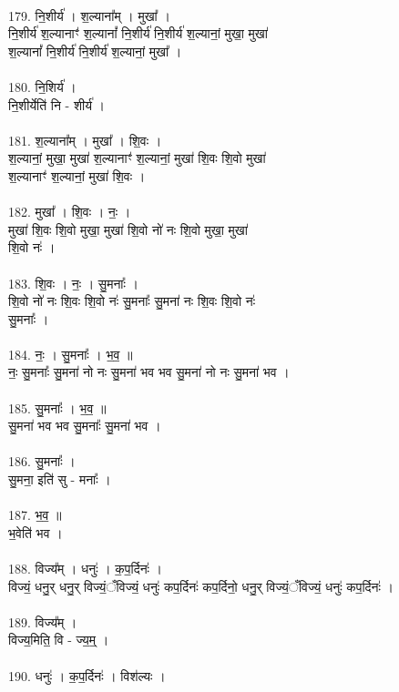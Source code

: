 \\
179. नि॒शीर्य॑ । श॒ल्याना᳚म् । मुखा᳚ ।\\
नि॒शीर्य॑ श॒ल्यानाꣳ॑ श॒ल्यानां᳚ नि॒शीर्य॑ नि॒शीर्य॑ श॒ल्यानां॒ मुखा॒ मुखा॑\\
श॒ल्यानां᳚ नि॒शीर्य॑ नि॒शीर्य॑ श॒ल्यानां॒ मुखा᳚ ।\\
\\
180. नि॒शिर्य॑ ।\\
नि॒शीर्येति॑ नि - शीर्य॑ ।\\
\\
181. श॒ल्याना᳚म् । मुखा᳚ । शि॒वः ।\\
श॒ल्यानां॒ मुखा॒ मुखा॑ श॒ल्यानाꣳ॑ श॒ल्यानां॒ मुखा॑ शि॒वः शि॒वो मुखा॑\\
श॒ल्यानाꣳ॑ श॒ल्यानां॒ मुखा॑ शि॒वः ।\\
\\
182. मुखा᳚ । शि॒वः । नः॒ ।\\
मुखा॑ शि॒वः शि॒वो मुखा॒ मुखा॑ शि॒वो नो॑ नः शि॒वो मुखा॒ मुखा॑\\
शि॒वो नः॑ ।\\
\\
183. शि॒वः । नः॒ । सु॒मनाः᳚ ।\\
शि॒वो नो॑ नः शि॒वः शि॒वो नः॑ सु॒मनाः᳚ सु॒मना॑ नः शि॒वः शि॒वो नः॑\\
सु॒मनाः᳚ ।\\
\\
184. नः॒ । सु॒मनाः᳚ । भ॒व॒ ॥\\
नः॒ सु॒मनाः᳚ सु॒मना॑ नो नः सु॒मना॑ भव भव सु॒मना॑ नो नः सु॒मना॑ भव ।\\
\\
185. सु॒मनाः᳚ । भ॒व॒ ॥\\
सु॒मना॑ भव भव सु॒मनाः᳚ सु॒मना॑ भव ।\\
\\
186. सु॒मनाः᳚ ।\\
सु॒मना॒ इति॑ सु - मनाः᳚ ।\\
\\
187. भ॒व॒ ॥\\
भ॒वेति॑ भव ।\\
\\
188. विज्य᳚म् । धनुः॑ । क॒प॒र्दिनः॑ ।\\
विज्यं॒ धनु॒र् धनु॒र् विज्यं॒ँविज्यं॒ धनुः॑ कप॒र्दिनः॑ कप॒र्दिनो॒ धनु॒र् विज्यं॒ँविज्यं॒ धनुः॑ कप॒र्दिनः॑ ।\\
\\
189. विज्य᳚म् ।\\
विज्य॒मिति॒ वि - ज्य॒म्॒ ।\\
\\
190. धनुः॑ । क॒प॒र्दिनः॑ । विश॑ल्यः ।\\
